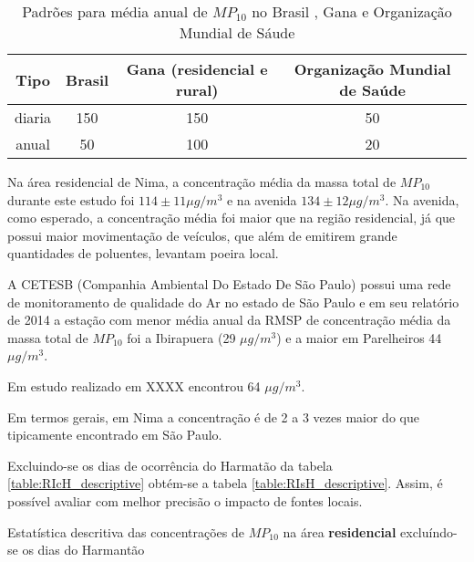 \begin{table}[H]
  \centering
      \begin{tabular}{cccc}
     \hline
   Tipo & Brasil & Gana (residencial e rural) & Organização Mundial de Saúde \\
     \hline
   diaria & 150 & 150 &  50 \\
     anual &  50 & 100 &  20 \\
      \hline
  \end{tabular}
  \caption{Padrões para média anual de $MP_{10}$ no Brasil \citep{conama1990}, 
           Gana \citep{epa2015} e 
           Organização Mundial de Sáude \citep{who}
           \label{table:pm10standards}}
\end{table}

Na área residencial de Nima, a concentração média da massa total de $MP_{10}$ 
durante este estudo foi $114\pm 11 \mu g / m^3$ e na avenida 
$134\pm 12 \mu g / m^3$. Na avenida, como esperado, a concentração média 
foi maior que na região residencial, já que possui maior movimentação de 
veículos, que além de emitirem grande quantidades de poluentes, levantam 
poeira local. 

A CETESB (Companhia Ambiental Do Estado De São Paulo) possui uma rede de 
monitoramento de qualidade do Ar no estado de São Paulo e em seu relatório 
de 2014 \citep{cetesb2014} a estação com menor média anual da RMSP 
de concentração média da massa total de $MP_{10}$ foi a Ibirapuera 
(29 $\mu g / m^3$) e a maior em Parelheiros 44 $\mu g / m^3$.  

Em estudo realizado em XXXX \cite{souza2014} encontrou 64 $\mu g / m^3$.

Em termos gerais, em Nima a concentração é de 2 a 3 vezes maior do que 
tipicamente encontrado em São Paulo. 

Excluindo-se os dias de ocorrência do Harmatão da tabela 
\ref{table:RIcH_descriptive} obtém-se a tabela \ref{table:RIsH_descriptive}.
Assim, é possível avaliar com melhor precisão o impacto de fontes locais.  

\begin{table}[H]
  \centering
    
  \caption{Estatística descritiva das concentrações de  $MP_{10}$ na área 
           \textbf{residencial} excluíndo-se os dias do Harmantão
            \label{table:RIsH_descriptive}}
\end{table}

